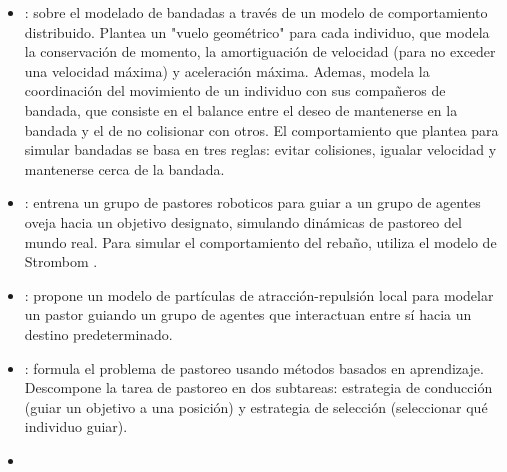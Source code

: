 \documentclass[final]{article}
\begin{document}
\begin{itemize}
    \item \citet{ReynoldsBoids}: sobre el modelado de bandadas a través de un modelo de comportamiento distribuido. Plantea un "vuelo geométrico" para cada
    individuo, que modela la conservación de momento, la amortiguación de velocidad (para no exceder una velocidad máxima) y aceleración máxima. Ademas, modela
    la coordinación del movimiento de un individuo con sus compañeros de bandada, que consiste en el balance entre el deseo de mantenerse en la bandada y el
    de no colisionar con otros. El comportamiento que plantea para simular bandadas se basa en tres reglas: evitar colisiones, igualar velocidad y mantenerse
    cerca de la bandada.
    \item \citet{SankarShepherding}: entrena un grupo de pastores roboticos para guiar a un grupo de agentes oveja hacia un objetivo designato, simulando
    dinámicas de pastoreo del mundo real. Para simular el comportamiento del rebaño, utiliza el modelo de Strombom \citep{Strombom}.
    \item \citet{Strombom}: propone un modelo de partículas de atracción-repulsión local para modelar un pastor guiando un grupo de agentes que interactuan entre
    sí hacia un destino predeterminado.
    \item \citet{NapolitanoShepherding}: formula el problema de pastoreo usando métodos basados en aprendizaje. Descompone la tarea de pastoreo en dos subtareas:
    estrategia de conducción (guiar un objetivo a una posición) y estrategia de selección (seleccionar qué individuo guiar).
    \item \citet{CovoneShepherding}
\end{itemize}



\end{document}
